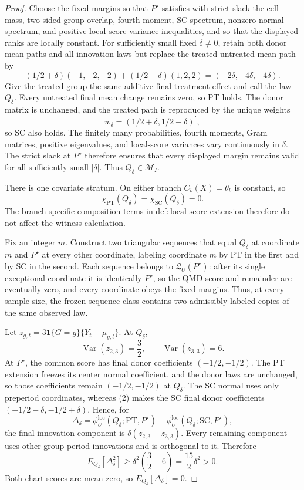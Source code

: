 \documentclass{article}
\begin{document}
\begin{proof}
Choose the fixed margins so that \(P^{\star}\) satisfies with strict slack the cell-mass, two-sided group-overlap, fourth-moment, SC-spectrum, nonzero-normal-spectrum, and positive local-score-variance inequalities, and so that the displayed ranks are locally constant.  For sufficiently small fixed \(\delta\ne0\), retain both donor mean paths and all innovation laws but replace the treated untreated mean path by
\[
 (1/2+\delta)(-1,-2,-2)+(1/2-\delta)(1,2,2)
 =(-2\delta,-4\delta,-4\delta).
 \tag{1}
\]
Give the treated group the same additive final treatment effect and call the law \(Q_\delta\).  Every untreated final mean change remains zero, so PT holds.  The donor matrix is unchanged, and the treated path is reproduced by the unique weights
\[
 w_\delta=(1/2+\delta,1/2-\delta)^{\prime},
 \tag{2}
\]
so SC also holds.  The finitely many probabilities, fourth moments, Gram matrices, positive eigenvalues, and local-score variances vary continuously in \(\delta\).  The strict slack at \(P^{\star}\) therefore ensures that every displayed margin remains valid for all sufficiently small \(|\delta|\).  Thus \(Q_\delta\in\mathcal M_I\).

There is one covariate stratum.  On either branch \(C_b(X)=\theta_b\) is constant, so
\[
 \chi_{\mathrm{PT}}(Q_\delta)=\chi_{\mathrm{SC}}(Q_\delta)=0.
 \tag{3}
\]
The branch-specific composition terms in \(\mathrm{def{:}local\text{-}score\text{-}extension}\) therefore do not affect the witness calculation.

Fix an integer \(m\).  Construct two triangular sequences that equal \(Q_\delta\) at coordinate \(m\) and \(P^{\star}\) at every other coordinate, labeling coordinate \(m\) by PT in the first and by SC in the second.  Each sequence belongs to \(\mathfrak L_U(P^{\star})\): after its single exceptional coordinate it is identically \(P^{\star}\), so the QMD score and remainder are eventually zero, and every coordinate obeys the fixed margins.  Thus, at every sample size, the frozen sequence class contains two admissibly labeled copies of the same observed law.

Let \(z_{g,t}=3\mathbf 1\{G=g\}\{Y_t-\mu_{g,t}\}\).  At \(Q_\delta\),
\[
 \operatorname{Var}(z_{2,3})=\frac32,
 \qquad
 \operatorname{Var}(z_{3,3})=6.
 \tag{4}
\]
At \(P^{\star}\), the common score has final donor coefficients \((-1/2,-1/2)\).  The PT extension freezes its center normal coefficient, and the donor laws are unchanged, so those coefficients remain \((-1/2,-1/2)\) at \(Q_\delta\).  The SC normal uses only preperiod coordinates, whereas (2) makes the SC final donor coefficients \((-1/2-\delta,-1/2+\delta)\).  Hence, for
\[
 \Delta_\delta
 =\phi_U^{\mathrm{loc}}(Q_\delta;\mathrm{PT},P^{\star})
 -\phi_U^{\mathrm{loc}}(Q_\delta;\mathrm{SC},P^{\star}),
 \tag{5}
\]
the final-innovation component is \(\delta(z_{2,3}-z_{3,3})\).  Every remaining component uses other group-period innovations and is orthogonal to it.  Therefore
\[
 E_{Q_\delta}[\Delta_\delta^2]
 \ge\delta^2\left(\frac32+6\right)
 =\frac{15}{2}\delta^2>0.
 \tag{6}
\]
Both chart scores are mean zero, so \(E_{Q_\delta}[\Delta_\delta]=0\).


\end{proof}
\end{document}
